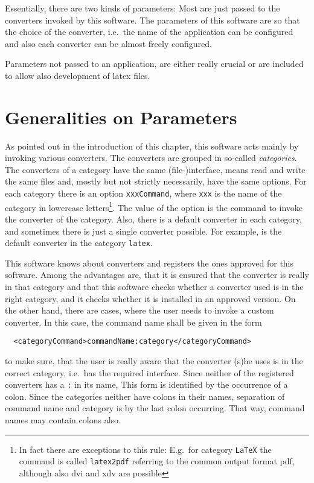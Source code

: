 Essentially, there are two kinds of parameters: 
Most are just passed to the converters invoked by this software. 
The parameters of this software 
are so that the choice of the converter, i.e.~the name of the application 
can be configured 
and also each converter can be almost freely configured. 

Parameters not passed to an application, 
are either really crucial 
or are included to allow also development of latex files. 

\section{Generalities on Parameters}\label{sec:genOnSettings}

As pointed out in the introduction of this chapter, 
this software acts mainly by invoking various converters. 
The converters are grouped in so-called {\em categories}. 
The converters of a category have the same (file-)interface, %
means read and write the same files and, 
mostly but not strictly necessarily, have the same options. 
For each category there is an option \texttt{xxxCommand}, 
where \texttt{xxx} is the name of the category in lowercase letters\footnote%
{In fact there are exceptions to this rule: E.g.~for category \texttt{LaTeX} 
the command is called \texttt{latex2pdf} referring to the common output format \gls{pdf}, 
although also \gls{dvi} and \gls{xdv} are possible}. 
The value of the option is the command to invoke the converter of the category. 
Also, there is a default converter in each category, 
and sometimes there is just a single converter possible. 
For example, \lualatex{} is the default converter in the category \texttt{latex}. 

This software knows about converters and registers the ones approved for this software. 
Among the advantages are, that it is ensured that the converter is really in that category 
and that this software checks whether a converter used is in the right category, 
and it checks whether it is installed in an approved version. 
On the other hand, there are cases, where the user needs to invoke a custom converter. 
In this case, the command name shall be given in the form 
%
\begin{verbatim}
  <categoryCommand>commandName:category</categoryCommand>
\end{verbatim}
%
to make sure, that the user is really aware that the converter (s)he uses 
is in the correct category, i.e.~has the required interface. 
Since neither of the registered converters has a \texttt{:} in its name, 
This form is identified by the occurrence of a colon. 
Since the categories neither have colons in their names, 
separation of command name and category is by the last colon occurring. 
That way, command names may contain colons also. 


